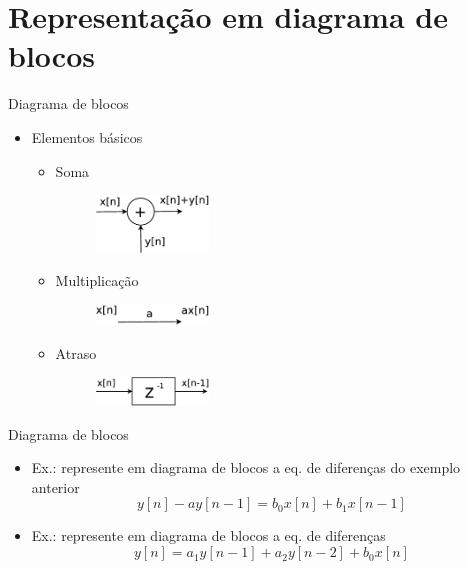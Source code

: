 \section{Representação em diagrama de blocos}
\begin{slide}{Diagrama de blocos}
\begin{itemize}
   \item Elementos básicos
   \begin{itemize}
      \item Soma
       \begin{figure}
          \centering
          \includegraphics[width = 0.3\textwidth]{figs/soma.eps}
       \end{figure}
      \item Multiplicação
      \begin{figure}
          \centering
          \includegraphics[width = 0.3\textwidth]{figs/mult.eps}
       \end{figure}
      \item Atraso
       \begin{figure}
          \centering
          \includegraphics[width = 0.3\textwidth]{figs/atraso.eps}
       \end{figure}
    \end{itemize}
\end{itemize}
\end{slide}

\begin{slide}{Diagrama de blocos}
\begin{itemize}
   \item Ex.: represente em diagrama de blocos a eq. de diferenças do exemplo anterior
    \begin{equation*}
        y[n] -ay[n-1]= b_0x[n]+b_1x[n-1] 
    \end{equation*}
   \item Ex.: represente em diagrama de blocos a eq. de diferenças 
   \begin{equation*}
        y[n]= a_1y[n-1]+a_2y[n-2]+b_0x[n] 
    \end{equation*}
\end{itemize}
\end{slide}

